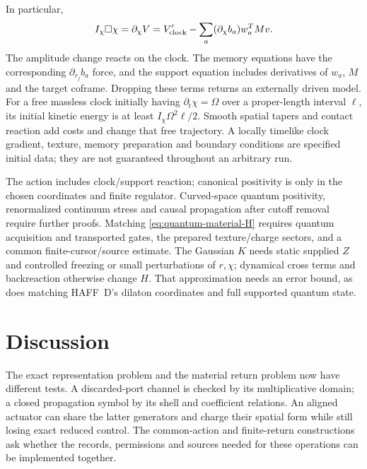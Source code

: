 In particular,
\[
 I_\chi\Box\chi=\partial_\chi V
 =V_{\rm clock}'-\sum_a(\partial_\chi b_a)w_a^TMv .
\]
The amplitude change reacts on the clock. The memory equations have
the corresponding $\partial_{r_j}b_a$ force, and the support equation
includes derivatives of $w_a$, $M$ and the target coframe.
Dropping these terms returns an externally driven model.
For a free massless clock initially having
$\partial_t\chi=\Omega$ over a proper-length interval $\ell$,
its initial kinetic energy is at least $I_\chi\Omega^2\ell/2$.
Smooth spatial tapers and contact reaction add costs and change that
free trajectory. A locally timelike clock gradient, texture, memory
preparation and boundary conditions are specified initial data; they
are not guaranteed throughout an arbitrary run.

The action includes clock/support reaction; canonical positivity is
only in the chosen coordinates and finite regulator. Curved-space
quantum positivity, renormalized continuum stress and causal propagation
after cutoff removal require further proofs. Matching
\eqref{eq:quantum-material-H} requires quantum acquisition and
transported gates, the prepared texture/charge sectors, and a common
finite-cursor/source estimate. The Gaussian $K$ needs static supplied
$Z$ and controlled freezing or small perturbations of $r,\chi$;
dynamical cross terms and backreaction otherwise change $H$. That
approximation needs an error bound, as does matching HAFF~D's dilaton
coordinates and full supported quantum state.

\section{Discussion}
\label{sec:discussion}

The exact representation problem and the material return problem now have
different tests. A discarded-port channel is checked by its multiplicative
domain; a closed propagation symbol by its shell and coefficient relations.
An aligned actuator can share the latter generators and charge their spatial
form while still losing exact reduced control.
The common-action and finite-return constructions ask whether the
records, permissions and sources needed for these operations can be
implemented together.

